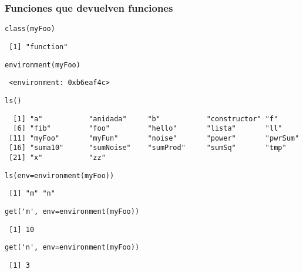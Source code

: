 \documentclass[xcolor={usenames,svgnames,dvipsnames}]{beamer}
\begin{document}
\begin{frame}[fragile]
\frametitle{Funciones que devuelven funciones}
\label{sec-2-6}


\lstset{language=R}
\begin{lstlisting}
class(myFoo)
\end{lstlisting}

\begin{verbatim}
 [1] "function"
\end{verbatim}


\lstset{language=R}
\begin{lstlisting}
environment(myFoo)
\end{lstlisting}

\begin{verbatim}
 <environment: 0xb6eaf4c>
\end{verbatim}


\lstset{language=R}
\begin{lstlisting}
ls()
\end{lstlisting}

\begin{verbatim}
  [1] "a"           "anidada"     "b"           "constructor" "f"          
  [6] "fib"         "foo"         "hello"       "lista"       "ll"         
 [11] "myFoo"       "myFun"       "noise"       "power"       "pwrSum"     
 [16] "suma10"      "sumNoise"    "sumProd"     "sumSq"       "tmp"        
 [21] "x"           "zz"
\end{verbatim}


\lstset{language=R}
\begin{lstlisting}
ls(env=environment(myFoo))
\end{lstlisting}

\begin{verbatim}
 [1] "m" "n"
\end{verbatim}


\lstset{language=R}
\begin{lstlisting}
get('m', env=environment(myFoo))
\end{lstlisting}

\begin{verbatim}
 [1] 10
\end{verbatim}


\lstset{language=R}
\begin{lstlisting}
get('n', env=environment(myFoo))
\end{lstlisting}

\begin{verbatim}
 [1] 3
\end{verbatim}
\end{frame}
\end{document}
